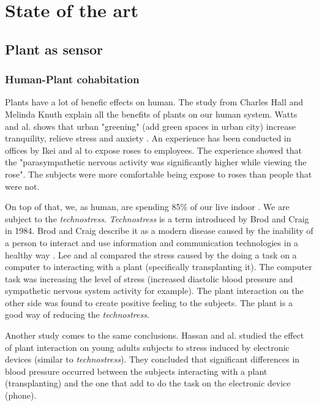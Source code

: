 \section{State of the art}

\subsection{Plant as sensor}

\subsubsection{Human-Plant cohabitation}

Plants have a lot of benefic effects on human. The study from Charles Hall and Melinda Knuth \cite{hallUpdateLiteratureSupporting2019}
explain all the benefits of plants on our human system.
Watts and al. shows that urban "greening" (add green spaces in urban city)
increase tranquility, relieve stress and anxiety \cite{wattsEffectsGreeningUrban2017}.
An experience has been conducted in offices by Ikei and al \cite{ikeiPhysiologicalPsychologicalRelaxing2014}
to expose roses to employees. The experience showed that the "parasympathetic nervous activity was significantly higher while viewing the rose".
The subjects were more comfortable
being expose to roses than people that were not.

On top of that, we, as human, are spending 85\% of our live indoor \cite{leeInteractionIndoorPlants2015}. We are subject to the
\textit{technostress}. \textit{Technostress} is a term introduced by Brod and Craig \cite{brod1984technostress} in 1984.
Brod and Craig describe it as a modern disease caused by the inability of a person to interact and use information and communication technologies
in a healthy way \cite{ayyagariTechnostressTechnologicalAntecedents2011}. Lee and al \cite{leeInteractionIndoorPlants2015} compared
the stress caused by the doing a task on a computer to interacting with a plant (specifically transplanting it).
The computer task was increasing the level of stress (increased diastolic blood pressure and sympathetic nervous system activity for example).
The plant interaction on the other side was found to create positive feeling to the subjects. The plant is a good way of reducing
the \textit{technostress}.

Another study comes to the same conclusions. Hassan and al. \cite{hassanEffectsPlantActivity2018}
studied the effect of plant interaction on young adults subjects to
stress induced by electronic devices (similar to \textit{technostress}).
They concluded that significant differences in blood pressure occurred
between the subjects interacting with a plant (transplanting) and the
one that add to do the task on the electronic device (phone).

